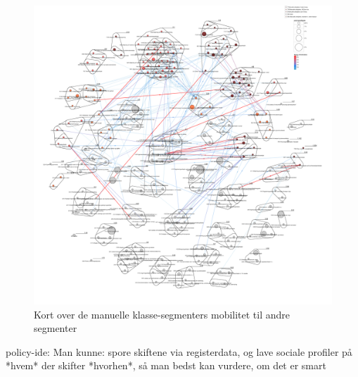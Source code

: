\begin{figure}[H]
\begin{centering}
  \includegraphics[width=10 cm]{fig/netvaerkskort/fokus_manuel_nonmanuel.pdf}
  \caption[Netværkskort: mobilitet fra den manuelle klasse]{Kort over de manuelle klasse-segmenters mobilitet til andre segmenter}
  \label{fig delanalyse3 manuelklasse fokus}
\end{centering}
\end{figure}

















% 
% 
%
%




policy-ide:
Man kunne: spore skiftene via registerdata, og lave sociale profiler på *hvem* der skifter *hvorhen*, så man bedst kan vurdere, om det er smart

